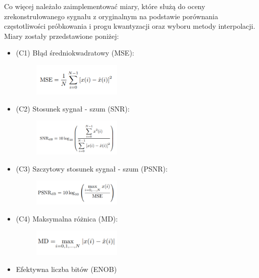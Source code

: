 \documentclass[12pt]{article}
\begin{document}
{        Co więcej należało zaimplementować miary, które służą do oceny zrekonstrułowanego
        sygnału z oryginalnym na podstawie porównania częstotliwości próbkowania i progu
        kwantyzacji oraz wyboru metody interpolacji. Miary zostały przedstawione poniżej:
        \begin{itemize}
            \item {
                (C1) Błąd średniokwadratowy (MSE):
                \begin{figure}[H]
                    \centering
                    \includegraphics[width=0.4\textwidth]{img/theory/blad-sredniokwad.png}
                \end{figure}
            }
            \item {
                (C2) Stosunek sygnał - szum (SNR):
                \begin{figure}[H]
                    \centering
                    \includegraphics[width=0.4\textwidth]{img/theory/stos-sygn-szum.png}
                \end{figure}
            }
            \item {
                (C3) Szczytowy stosunek sygnał - szum (PSNR):
                \begin{figure}[H]
                    \centering
                    \includegraphics[width=0.4\textwidth]{img/theory/szyt-stos-sygn-szum.png}
                \end{figure}
            }
            \item {
                (C4) Maksymalna różnica (MD):
                \begin{figure}[H]
                    \centering
                    \includegraphics[width=0.4\textwidth]{img/theory/max-roznica.png}
                \end{figure}
            }
            \item {
                Efektywna liczba bitów (ENOB)
            }
        \end{itemize}
    }
    \newpage
\end{document}
